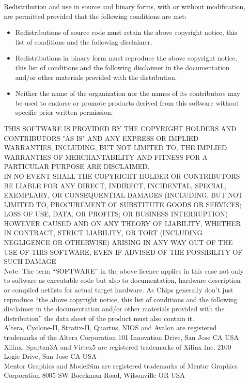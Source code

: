 \documentclass{ruschidoc}
\begin{document}
Redistribution and use in source and binary forms, with or without modification, are
permitted provided that the following conditions are met:
\begin{itemize}
\item Redistributions of source code must retain the above copyright notice, this
  list of conditions and the following disclaimer.
\item Redistributions in binary form must reproduce the above copyright notice, this
  list of conditions and the following disclaimer in the documentation and/or other
  materials provided with the distribution.
\item Neither the name of the organization nor the names of its contributors may be
  used to endorse or promote products derived from this software without specific
  prior written permission.
\end{itemize}
 THIS SOFTWARE IS PROVIDED BY THE COPYRIGHT HOLDERS AND CONTRIBUTORS "AS IS"
 AND ANY EXPRESS OR IMPLIED WARRANTIES, INCLUDING, BUT NOT LIMITED TO, THE
 IMPLIED WARRANTIES OF MERCHANTABILITY AND FITNESS FOR A PARTICULAR PURPOSE
 ARE DISCLAIMED. \\
IN NO EVENT SHALL THE COPYRIGHT HOLDER OR CONTRIBUTORS BE
 LIABLE FOR ANY DIRECT, INDIRECT, INCIDENTAL, SPECIAL, EXEMPLARY,
 OR CONSEQUENTIAL DAMAGES (INCLUDING, BUT NOT LIMITED TO, PROCUREMENT OF
 SUBSTITUTE GOODS OR SERVICES; LOSS OF USE, DATA, OR PROFITS; OR BUSINESS
 INTERRUPTION) HOWEVER CAUSED AND ON ANY THEORY OF LIABILITY, WHETHER IN
 CONTRACT, STRICT LIABILITY, OR TORT (INCLUDING NEGLIGENCE OR OTHERWISE)
 ARISING IN ANY WAY OUT OF THE USE OF THIS SOFTWARE, EVEN IF ADVISED OF
 THE POSSIBILITY OF SUCH DAMAGE\\

 Note: The term ``SOFTWARE'' in the above licence applies in this case not only to
 software as executable code but also to documentation, hardware description or
 compiled netlists for actual target hardware. As Chips generally don't just
 reproduce ``the above copyright notice, this list of conditions and the following
 disclaimer in the documentation and/or other materials provided with the
 distribution'' the data sheet of the product must also contain it.\\

 Altera, Cyclone-II, Stratix-II, Quartus, NIOS and Avalon are registered trademarks of the Altera
 Corporation
 101 Innovation Drive, San Jose CA USA \\
 Xilinx, Spartan3A and Virtex5 are registered trademarks of Xilinx Inc. 2100 Logic Drive, San Jose CA USA \\
 Mentor Graphics and ModelSim are registered trademarks of Mentor Graphics
 Corporation 8005 SW Boeckman Road, Wilsonville OR USA \newpage

\printacronym
\printglossary


\revisionTable
\end{document}
